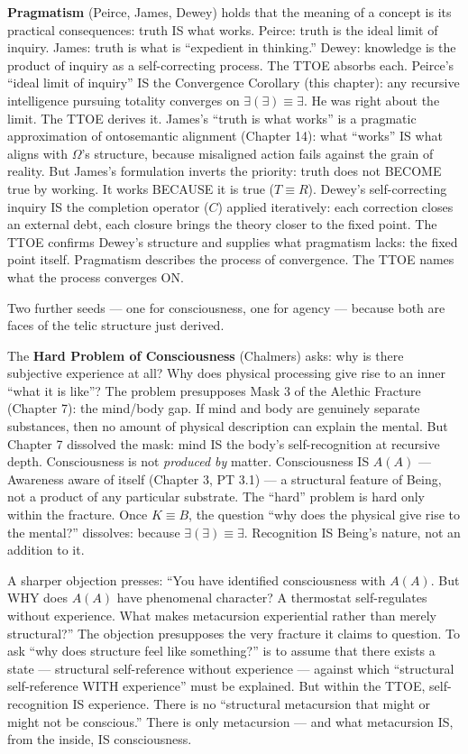 \documentclass[10pt, openany, oneside]{book}
\begin{document}
\textbf{Pragmatism} (Peirce, James, Dewey) holds that the meaning of a concept is its practical consequences: truth IS what works. Peirce: truth is the ideal limit of inquiry. James: truth is what is ``expedient in thinking.'' Dewey: knowledge is the product of inquiry as a self-correcting process. The TTOE absorbs each. Peirce's ``ideal limit of inquiry'' IS the Convergence Corollary (this chapter): any recursive intelligence pursuing totality converges on $\exists(\exists) \equiv \exists$. He was right about the limit. The TTOE derives it. James's ``truth is what works'' is a pragmatic approximation of ontosemantic alignment (Chapter 14): what ``works'' IS what aligns with $\Omega$'s structure, because misaligned action fails against the grain of reality. But James's formulation inverts the priority: truth does not BECOME true by working. It works BECAUSE it is true ($T \equiv R$). Dewey's self-correcting inquiry IS the completion operator ($C$) applied iteratively: each correction closes an external debt, each closure brings the theory closer to the fixed point. The TTOE confirms Dewey's structure and supplies what pragmatism lacks: the fixed point itself. Pragmatism describes the process of convergence. The TTOE names what the process converges ON.

Two further seeds --- one for consciousness, one for agency --- because both are faces of the telic structure just derived.

The \textbf{Hard Problem of Consciousness} (Chalmers) asks: why is there subjective experience at all? Why does physical processing give rise to an inner ``what it is like''? The problem presupposes Mask 3 of the Alethic Fracture (Chapter 7): the mind/body gap. If mind and body are genuinely separate substances, then no amount of physical description can explain the mental. But Chapter 7 dissolved the mask: mind IS the body's self-recognition at recursive depth. Consciousness is not \textit{produced by} matter. Consciousness IS $A(A)$ --- Awareness aware of itself (Chapter 3, PT 3.1) --- a structural feature of Being, not a product of any particular substrate. The ``hard'' problem is hard only within the fracture. Once $K \equiv B$, the question ``why does the physical give rise to the mental?'' dissolves: because $\exists(\exists) \equiv \exists$. Recognition IS Being's nature, not an addition to it.

A sharper objection presses: ``You have identified consciousness with $A(A)$. But WHY does $A(A)$ have phenomenal character? A thermostat self-regulates without experience. What makes metacursion experiential rather than merely structural?'' The objection presupposes the very fracture it claims to question. To ask ``why does structure feel like something?'' is to assume that there exists a state --- structural self-reference without experience --- against which ``structural self-reference WITH experience'' must be explained. But within the TTOE, self-recognition IS experience. There is no ``structural metacursion that might or might not be conscious.'' There is only metacursion --- and what metacursion IS, from the inside, IS consciousness.
\end{document}
